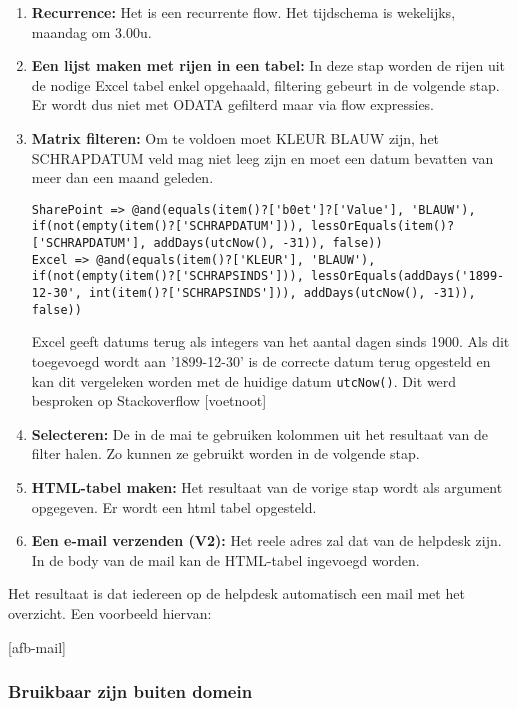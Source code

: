 \begin{enumerate}
    \item \textbf{Recurrence:} Het is een recurrente flow. Het tijdschema is wekelijks, maandag om 3.00u.
    \item \textbf{Een lijst maken met rijen in een tabel:} In deze stap worden de rijen uit de nodige Excel tabel enkel opgehaald, filtering gebeurt in de volgende stap. Er wordt dus niet met ODATA gefilterd maar via flow expressies.
    \item \textbf{Matrix filteren:} Om te voldoen moet KLEUR BLAUW zijn, het SCHRAPDATUM veld mag niet leeg zijn en moet een datum bevatten van meer dan een maand geleden.
\begin{lstlisting}
SharePoint => @and(equals(item()?['b0et']?['Value'], 'BLAUW'), if(not(empty(item()?['SCHRAPDATUM'])), lessOrEquals(item()?['SCHRAPDATUM'], addDays(utcNow(), -31)), false))
Excel => @and(equals(item()?['KLEUR'], 'BLAUW'), if(not(empty(item()?['SCHRAPSINDS'])), lessOrEquals(addDays('1899-12-30', int(item()?['SCHRAPSINDS'])), addDays(utcNow(), -31)), false))
\end{lstlisting}
    Excel geeft datums terug als integers van het aantal dagen sinds 1900. Als dit toegevoegd wordt aan '1899-12-30' is de correcte datum terug opgesteld en kan dit vergeleken worden met de huidige datum \lstinline|utcNow()|. Dit werd besproken op Stackoverflow [voetnoot]
    \item \textbf{Selecteren:} De in de mai te gebruiken kolommen uit het resultaat van de filter halen. Zo kunnen ze gebruikt worden in de volgende stap.
    \item \textbf{HTML-tabel maken:} Het resultaat van de vorige stap wordt als argument opgegeven. Er wordt een html tabel opgesteld.
    \item \textbf{Een e-mail verzenden (V2):} Het reele adres zal dat van de helpdesk zijn. In de body van de mail kan de HTML-tabel ingevoegd worden.
\end{enumerate}

Het resultaat is dat iedereen op de helpdesk automatisch een mail met het overzicht. Een voorbeeld hiervan:

[afb-mail]


\subsubsection{Bruikbaar zijn buiten domein}

